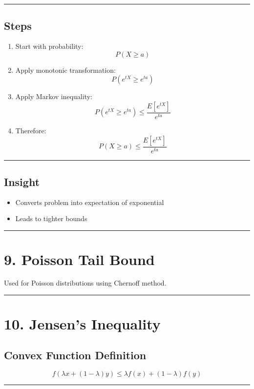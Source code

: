 \documentclass[12pt]{article}
\begin{document}
\hrule

\subsection*{Steps}

\begin{enumerate}
\item Start with probability:
\[
P(X \geq a)
\]

\item Apply monotonic transformation:
\[
P(e^{tX} \geq e^{ta})
\]

\item Apply Markov inequality:
\[
P(e^{tX} \geq e^{ta}) \leq \frac{E[e^{tX}]}{e^{ta}}
\]

\item Therefore:
\[
P(X \geq a) \leq \frac{E[e^{tX}]}{e^{ta}}
\]
\end{enumerate}

\hrule

\subsection*{Insight}

\begin{itemize}
\item Converts problem into expectation of exponential
\item Leads to tighter bounds
\end{itemize}

\hrule

\section*{9. Poisson Tail Bound}

Used for Poisson distributions using Chernoff method.

\hrule

\section*{10. Jensen’s Inequality}

\subsection*{Convex Function Definition}

\[
f(\lambda x + (1-\lambda)y) \leq \lambda f(x) + (1-\lambda)f(y)
\]

\hrule
\end{document}
